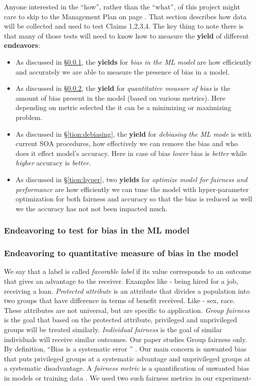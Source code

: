 \documentclass{NSF}
\newenvironment{myitemize}
{ \begin{itemize}
    \setlength{\itemsep}{0pt}
    \setlength{\parskip}{0pt}
    \setlength{\parsep}{0pt}     }
{ \end{itemize}                  }
\newcommand{\bi}{\begin{myitemize}}
\newcommand{\ei}{\end{myitemize}}
\newcommand{\tion}[1]{\S\ref{tion:#1}}
\begin{document}
\begin{nsfdescription}
Anyone  interested in the ``how'', rather than the ``what'', of this project
might care to skip to the Management Plan on page \pageref{tion:plan}. That section 
 describes how  data
will be collected  and used
to test Claims 1,2,3,4.  The key thing to note
there is that many of those
tests will need to know how to measure
the {\bf yield} of different {\bf endeavors}:
\bi
\item 
As discussed in \tion{test_bias}, the {\bf yields} for {\em bias in the ML model} are how efficiently and accurately we are able to measure the presence of bias in a model.
\item 
As discussed in \tion{quantitative_measure}, the {\bf yield} for {\em quantitative measure of bias}
is the amount of bias present in the model (based on various metrics). Here depending on metric selected the it can be a minimizing or maximizing problem.
\item 
As discussed in \tion{debiasing}, the {\bf yield} for {\em debiasing the ML mode} is with current SOA procedures, how effectively we can remove the bias and who does it effect model's accuracy. Here in case of bias {\em lower} bias is {\em better} while {\em higher} accuracy is {\em better}.
\item 
As discussed in \tion{hyper},  two {\bf yields} for {\em optimize model for fairness and performance} are how efficiently we can tune the model with hyper-parameter optimization for both fairness and accuracy so that the bias is reduced as well we the accuracy has not not been impacted much.
\ei

\subsubsection{Endeavoring to test for bias in the ML model}\label{tion:test_bias}

\subsubsection{Endeavoring to quantitative measure of bias in the model}\label{tion:quantitative_measure}
We say that a label is called \textit{favorable label} if its  value corresponds to an outcome that gives an advantage to the receiver. Examples like - being hired for a job, receiving a loan. \textit{Protected attribute} is an attribute that divides a population into two groups that have difference in terms of benefit received. Like - sex, race. These attributes are not universal, but are specific to application. \textit{Group fairness} is the goal that based on the protected attribute, privileged and unprivileged groups will be treated similarly. \textit{Individual fairness} is the goal of similar individuals will receive similar outcomes.  Our paper studies Group fairness only.
By definition, ``Bias is a systematic error '' \cite{bias_systemetic}. Our main concern is unwanted bias that puts privileged groups at a systematic advantage and unprivileged groups at a systematic disadvantage. A \textit{fairness metric} is a quantification of unwanted bias in models or training data \cite{IBM}. We used two such fairness metrics in our experiment-


\end{nsfdescription}
\end{document}
